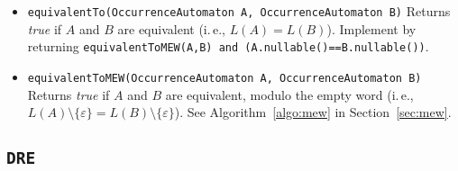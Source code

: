 \documentclass[a4paper,11pt, svgnames,titlepage]{article}
\newcommand{\emptyword}{\varepsilon}
\begin{document}
\begin{itemize}
\item\texttt{equivalentTo(OccurrenceAutomaton A, OccurrenceAutomaton B)} Returns \emph{true} if $A$ and $B$ are equivalent (i.\,e., $L(A)=L(B)$). Implement by returning \texttt{equivalentToMEW(A,B) and (A.nullable()==B.nullable())}.
\item\texttt{equivalentToMEW(OccurrenceAutomaton A, OccurrenceAutomaton B)} Returns \emph{true} if $A$ and $B$ are equivalent, modulo the empty word (i.\,e., $L(A)\setminus\{\emptyword\}=L(B)\setminus\{\emptyword\}$). See Algorithm~\ref{algo:mew} in Section~\ref{sec:mew}.

\end{itemize}
\subsection{\texttt{DRE}}\label{sec:des:dre}
\end{document}
